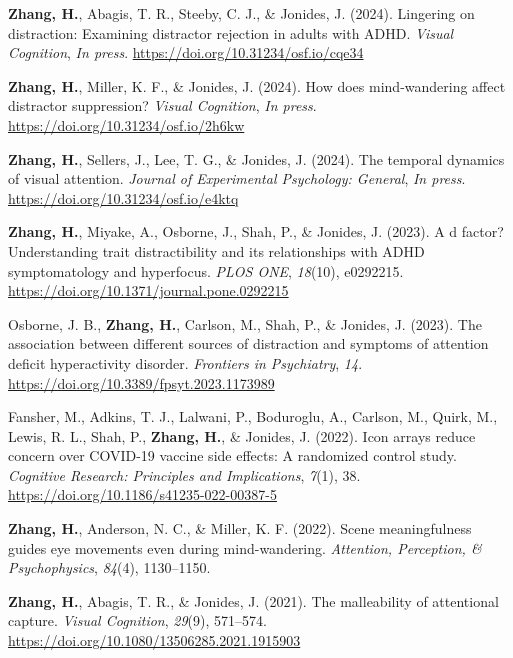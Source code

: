 \documentclass[11pt,a4paper,]{awesome-cv}
\begin{document}
\leavevmode{}%
\textbf{Zhang, H.}, Abagis, T. R., Steeby, C. J., \& Jonides, J. (2024).
Lingering on distraction: Examining distractor rejection in adults with
ADHD. \emph{Visual Cognition}, \emph{In press}.
\url{https://doi.org/10.31234/osf.io/cqe34}

\leavevmode{}%
\textbf{Zhang, H.}, Miller, K. F., \& Jonides, J. (2024). How does
mind-wandering affect distractor suppression? \emph{Visual Cognition},
\emph{In press}. \url{https://doi.org/10.31234/osf.io/2h6kw}

\leavevmode{}%
\textbf{Zhang, H.}, Sellers, J., Lee, T. G., \& Jonides, J. (2024). The
temporal dynamics of visual attention. \emph{Journal of Experimental
Psychology: General}, \emph{In press}.
\url{https://doi.org/10.31234/osf.io/e4ktq}

\leavevmode{}%
\textbf{Zhang, H.}, Miyake, A., Osborne, J., Shah, P., \& Jonides, J.
(2023). A d factor? Understanding trait distractibility and its
relationships with ADHD symptomatology and hyperfocus. \emph{PLOS ONE},
\emph{18}(10), e0292215.
\url{https://doi.org/10.1371/journal.pone.0292215}

\leavevmode{}%
Osborne, J. B., \textbf{Zhang, H.}, Carlson, M., Shah, P., \& Jonides,
J. (2023). The association between different sources of distraction and
symptoms of attention deficit hyperactivity disorder. \emph{Frontiers in
Psychiatry}, \emph{14}. \url{https://doi.org/10.3389/fpsyt.2023.1173989}

\leavevmode{}%
Fansher, M., Adkins, T. J., Lalwani, P., Boduroglu, A., Carlson, M.,
Quirk, M., Lewis, R. L., Shah, P., \textbf{Zhang, H.}, \& Jonides, J.
(2022). Icon arrays reduce concern over COVID-19 vaccine side effects: A
randomized control study. \emph{Cognitive Research: Principles and
Implications}, \emph{7}(1), 38.
\url{https://doi.org/10.1186/s41235-022-00387-5}

\leavevmode{}%
\textbf{Zhang, H.}, Anderson, N. C., \& Miller, K. F. (2022). Scene
meaningfulness guides eye movements even during mind-wandering.
\emph{Attention, Perception, \& Psychophysics}, \emph{84}(4),
1130--1150.

\leavevmode{}%
\textbf{Zhang, H.}, Abagis, T. R., \& Jonides, J. (2021). The
malleability of attentional capture. \emph{Visual Cognition},
\emph{29}(9), 571--574.
\url{https://doi.org/10.1080/13506285.2021.1915903}
\end{document}
